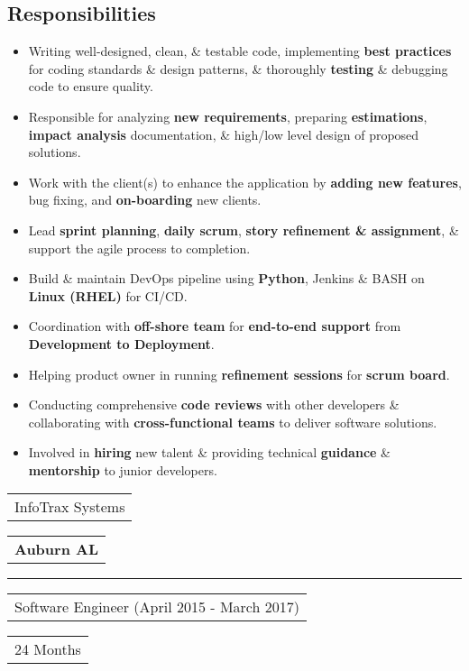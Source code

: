 \documentclass[letterpaper,9pt]{article}
\begin{document}
    \subsection{Responsibilities}
	\begin{itemize}
	\item Writing well-designed, clean, \& testable code, implementing \textbf{\color{black}best practices} for coding standards \& design patterns, \& thoroughly \textbf{\color{black}testing} \& debugging code to ensure quality.
    \item Responsible for analyzing \textbf{\color{black}new requirements}, preparing \textbf{\color{black}estimations}, \textbf{\color{black}impact analysis} documentation, \& high/low level design of proposed solutions.
    \item Work with the client(s) to enhance the application by \textbf{\color{black}adding new features}, bug fixing, and \textbf{\color{black}on-boarding} new clients.
    \item Lead \textbf{\color{black}sprint planning}, \textbf{\color{black}daily scrum}, \textbf{\color{black}story refinement \& assignment}, \& support the agile process to completion.
    \item Build \& maintain DevOps pipeline using \textbf{\color{black}Python}, Jenkins \& BASH on \textbf{\color{black}Linux (RHEL)} for CI/CD.
    \item Coordination with \textbf{\color{black}off-shore team} for \textbf{\color{black}end-to-end support} from \textbf{\color{black}Development to Deployment}.
    \item Helping product owner in running \textbf{\color{black}refinement sessions} for \textbf{\color{black}scrum board}.
    \item Conducting comprehensive \textbf{\color{black}code reviews} with other developers \& collaborating with \textbf{\color{black}cross-functional teams} to deliver software solutions.
    \item Involved in \textbf{hiring} new talent \& providing technical \textbf{\color{black}guidance} \& \textbf{\color{black}mentorship} to junior developers.
	\end{itemize}

	\pagebreak


    \vspace{1.27cm}
    \noindent
    \begin{tabular}[t]{@{}l}
    \Large{InfoTrax Systems}
    \end{tabular}
    \hfill
    \begin{tabular}[t]{l@{}}
    \textbf{\color{black}Auburn AL}
    \end{tabular}
    \noindent\rule{\textwidth}{0.5pt}
    \begin{tabular}[t]{@{}l}
    Software Engineer (April 2015 - March 2017)
    \end{tabular}
    \hfill
    \begin{tabular}[t]{l@{}}
    24 Months
    \end{tabular}
\end{document}
